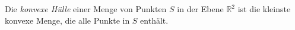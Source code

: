\begin{definition}
%
%
    Die \emph{konvexe Hülle} einer Menge von Punkten $S$ in der Ebene $\mathbb{R}^2$ ist die kleinste konvexe Menge, die alle Punkte in $S$ enthält.
\end{definition}
